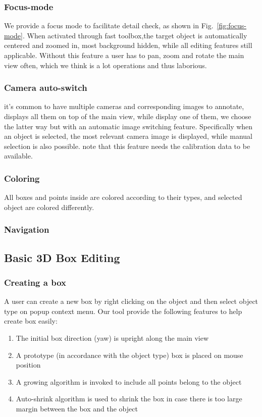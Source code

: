 \documentclass[letterpaper, 10 pt, conference]{ieeeconf}  %
\begin{document}
\subsubsection{Focus-mode}
We provide a focus mode to facilitate detail check, as shown in Fig.~\ref{fig:focus-mode}. When activated through fast toolbox,the target object is automatically centered and zoomed in, most background hidden, while all editing features still applicable. Without this feature a user has to pan,  zoom and rotate the main view often, which we think is a lot operations and thus laborious.

\subsubsection{Camera auto-switch}
it's common to have multiple cameras and corresponding images to annotate, \cite{Zimmer20193DBA} displays all them on top of the main view, while \cite{} display one of them, we choose the latter way but with an automatic image switching feature. Specifically when an object is selected, the most relevant camera image is displayed, while manual selection is also possible.
note that this feature needs the calibration data to be available.

\subsubsection{Coloring}
All boxes and points inside are colored according to their types, and selected object are colored differently.

\subsubsection{Navigation}
\label{section:navigation}
\subsection{Basic 3D Box Editing}

\subsubsection{Creating a box}

A user can create a new box by right clicking on the object  and then select object type on popup context menu. Our tool provide the following features to help create box easily:

\begin{enumerate}
	\item The initial box direction (yaw) is upright along the main view
	\item A prototype (in accordance with the object type) box is placed on mouse position
	\item A growing algorithm is invoked to include all points belong to the object
	\item Auto-shrink algorithm is used to shrink the box in case there is too large margin between the box and the object
\end{enumerate}
\end{document}
